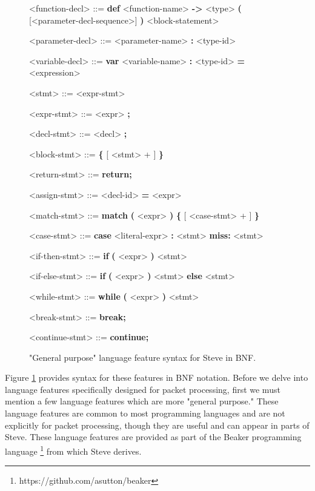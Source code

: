 \begin{figure}
\begin{mdframed}
\begin{grammar}

<function-decl> ::=
\textbf{def} <function-name> \textbf{-\textgreater} <type> 
\textbf{(} [<parameter-decl-sequence>] \textbf{)} <block-statement>

<parameter-decl> ::=
<parameter-name> \textbf{:} <type-id>

<variable-decl> ::=
\textbf{var} <variable-name> \textbf{:} <type-id> \textbf{=} <expression>

<stmt> ::=
<expr-stmt>

<expr-stmt> ::= <expr> \textbf{;}

<decl-stmt> ::= <decl> \textbf{;}


<block-stmt> ::= 
\textbf{\{}
	[ <stmt> + ]
\textbf{\}}

<return-stmt> ::= \textbf{return;}

<assign-stmt> ::= <decl-id> \textbf{=} <expr>

<match-stmt> ::= \textbf{match} \textbf{(} <expr> \textbf{)}
\textbf{\{}
	[ <case-stmt> + ]
\textbf{\}}

<case-stmt> ::=
\textbf{case} <literal-expr> \textbf{:} <stmt>
\alt \textbf{miss:} <stmt>

<if-then-stmt> ::= \textbf{if} \textbf{(} <expr> \textbf{)}
<stmt>

<if-else-stmt> ::= \textbf{if} \textbf{(} <expr> \textbf{)}
<stmt> \textbf{else} <stmt>

<while-stmt> ::= \textbf{while} \textbf{(} <expr> \textbf{)}
<stmt>

<break-stmt> ::= \textbf{break;}

<continue-stmt> ::= \textbf{continue;}

\end{grammar}
\end{mdframed}
\caption{"General purpose" language feature syntax for Steve in BNF.}
\label{fg:general_syntax}
\end{figure}

Figure \ref{fg:general_syntax} provides syntax for these features in BNF notation. Before we delve into language features specifically designed for packet processing, first we must mention a few language features which are more "general purpose." These language features are common to most programming languages and are not explicitly for packet processing, though they are useful and can appear in parts of Steve. These language features are provided as part of the Beaker programming language \footnote{https://github.com/asutton/beaker} from which Steve derives.

